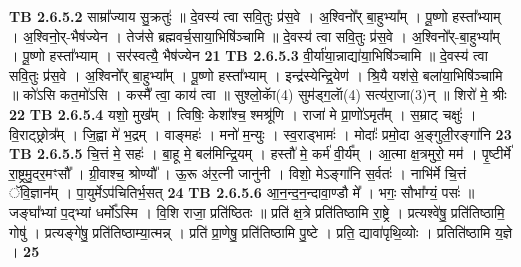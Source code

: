 \documentclass[17pt]{extarticle}
\begin{document}
                  \newline
                                \textbf{ TB 2.6.5.2} \newline
                  साम्रा᳚ज्याय सु॒क्रतुः॑ ॥ दे॒वस्य॑ त्वा सवि॒तुः प्र॑स॒वे । अ॒श्विनो᳚र् बा॒हुभ्या᳚म् । पू॒ष्णो हस्ता᳚भ्याम् । अ॒श्विनो॒र्-भैष॑ज्येन । तेज॑से ब्रह्मवर्च॒साया॒भिषि॑ञ्चामि ॥ दे॒वस्य॑ त्वा सवि॒तुः प्र॑स॒वे । अ॒श्विनो᳚र्-बा॒हुभ्या᳚म् । पू॒ष्णो हस्ता᳚भ्याम् । सर॑स्वत्यै॒ भैष॑ज्येन \textbf{ 21} \newline
                  \newline
                                \textbf{ TB 2.6.5.3} \newline
                  वी॒र्या॑या॒न्नाद्या॑या॒भिषि॑ञ्चामि ॥ दे॒वस्य॑ त्वा सवि॒तुः प्र॑स॒वे । अ॒श्विनो᳚र् बा॒हुभ्या᳚म् । पू॒ष्णो हस्ता᳚भ्याम् । इन्द्र॑स्येन्द्रि॒येण॑ । श्रि॒यै यश॑से॒ बला॑या॒भिषि॑ञ्चामि ॥ को॑ऽसि कत॒मो॑ऽसि । कस्मै᳚ त्वा॒ काय॑ त्वा ॥ सुश्लो॒काॅ(4) सुम॑ड्ग॒लाॅ(4) सत्य॑रा॒जा(3)न् ॥ शिरो॑ मे॒ श्रीः \textbf{ 22} \newline
                  \newline
                                \textbf{ TB 2.6.5.4} \newline
                  यशो॒ मुख᳚म् । त्विषिः॒ केशा᳚श्च॒ श्मश्रू॑णि । राजा॑ मे प्रा॒णो॑ऽमृत᳚म् । स॒म्राट् चक्षुः॑ । वि॒राट्छ्रोत्र᳚म् । जि॒ह्वा मे॑ भ॒द्रम् । वाङ्महः॑ । मनो॑ म॒न्युः । स्व॒राड्भामः॑ । मोदाः᳚ प्रमो॒दा अ॒ङ्गुली॒रङ्गा॑नि \textbf{ 23} \newline
                  \newline
                                \textbf{ TB 2.6.5.5} \newline
                  चि॒त्तं मे॒ सहः॑ । बा॒हू मे॒ बल॑मिन्द्रि॒यम् । हस्तौ॑ मे॒ कर्म॑ वी॒र्य᳚म् । आ॒त्मा क्ष॒त्रमुरो॒ मम॑ । पृ॒ष्टीर्मे॑ रा॒ष्ट्रमु॒दर॒मꣳसौ᳚ । ग्री॒वाश्च॒ श्रोण्यौ᳚ । ऊ॒रू अ॑र॒त्नी जानु॑नी । विशो॒ मेऽङ्गा॑नि स॒र्वतः॑ । नाभि॑र्मे चि॒त्तं ॅवि॒ज्ञान᳚म् । पा॒युर्मेऽप॑चितिर्भ॒सत् \textbf{ 24} \newline
                  \newline
                                \textbf{ TB 2.6.5.6} \newline
                  आ॒न॒न्द॒न॒न्दावा॒ण्डौ मे᳚ । भगः॒ सौभा᳚ग्यं॒ पसः॑ ॥ जङ्घा᳚भ्यां प॒द्भ्यां धर्मो᳚ऽस्मि । वि॒शि राजा॒ प्रति॑ष्ठितः ॥ प्रति॑ क्ष॒त्रे प्रति॑तिष्ठामि रा॒ष्ट्रे । प्रत्यश्वे॑षु॒ प्रति॑तिष्ठामि॒ गोषु॑ । प्रत्यङ्गे॑षु॒ प्रति॑तिष्ठाम्या॒त्मन्न् । प्रति॑ प्रा॒णेषु॒ प्रति॑तिष्ठामि पु॒ष्टे । प्रति॒ द्यावा॑पृथि॒व्योः । प्रतिति॑ष्ठामि य॒ज्ञे । \textbf{ 25} \newline
\end{document}
